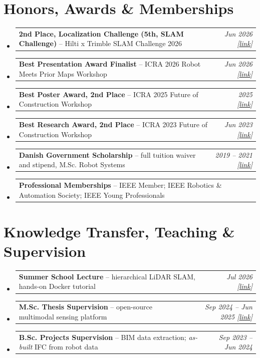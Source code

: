 \documentclass[a4paper,11pt]{article}
\makeatletter
\newcommand{\resumePOR}[3]{
\vspace{0.5mm}\item
    \begin{tabular*}{0.97\textwidth}[t]{l@{\extracolsep{\fill}}r}
        \textbf{#1}\hspace{0.3mm}#2 & \textit{\small{#3}}
    \end{tabular*}
    \vspace{-2mm}
}
\newcommand{\resumeSubHeadingListStart}{\begin{itemize}[leftmargin=*,labelsep=1mm]}
\newcommand{\resumeSubHeadingListEnd}{\end{itemize}\vspace{2mm}}
\makeatother
\begin{document}
\section{\textbf{Honors, Awards \& Memberships}}
\vspace{-0.4mm}
\resumeSubHeadingListStart
\resumePOR{2nd Place, Localization Challenge (5th, SLAM Challenge)}
    { -- Hilti x Trimble SLAM Challenge 2026}
    {Jun 2026 [\href{https://1drv.ms/b/c/4db9ccab9d8d9130/IQAVaj7i87MISqTeKhItu4OcAVn_ldM8NaGeo2eHFK6QC8Q?e=fDm2Pt}{link}]}
\resumePOR{Best Presentation Award Finalist}
    { -- ICRA 2026 Robot Meets Prior Maps Workshop}
    {Jun 2026 [\href{https://1drv.ms/i/c/4db9ccab9d8d9130/IQB3rUq4c1sJTb4PupPbnu5DAYNO4_C31DYuqXdi1GAZZKc?e=5cLZrE}{link}]}
\resumePOR{Best Poster Award, 2nd Place}
    { -- ICRA 2025 Future of Construction Workshop}
    {2025 [\href{https://construction-robots.github.io/index2025.html}{link}]}
\resumePOR{Best Research Award, 2nd Place}
    { -- ICRA 2023 Future of Construction Workshop}
    {Jun 2023 [\href{https://construction-robots.github.io/index2023.html}{link}]}
\resumePOR{Danish Government Scholarship}
    { -- full tuition waiver and stipend, M.Sc. Robot Systems}
    {2019 -- 2021 [\href{https://1drv.ms/b/c/4db9ccab9d8d9130/ETCRjZ2rzLkggE2rAAAAAAABBNsNs5ey6KEt632-vZz3jw?e=88YskF}{link}]}
\resumePOR{Professional Memberships}{ -- IEEE Member; IEEE Robotics \& Automation Society; IEEE Young Professionals}{}
\resumeSubHeadingListEnd
\vspace{-4mm}

\section{\textbf{Knowledge Transfer, Teaching \& Supervision}}
\vspace{-0.4mm}
\resumeSubHeadingListStart
\resumePOR{Summer School Lecture}{ -- hierarchical LiDAR SLAM, hands-on Docker tutorial}{Jul 2026 [\href{https://1drv.ms/b/c/4db9ccab9d8d9130/IQBY7fpZ9b9VQ7ZUtCZ3sQIXAe86RLZ_U_7Ici1Zl6MGrRI?e=UOcUQ3}{link}]}
\resumePOR{M.Sc. Thesis Supervision}{ -- open-source multimodal sensing platform}{Sep 2024 -- Jun 2025 [\href{https://1drv.ms/i/c/4db9ccab9d8d9130/ETsNxw8pvjdFtTJgmw_oU4gBiKo2bBd7cUP9dOsaJytEFg?e=aSnSOA}{link}]}
\resumePOR{B.Sc. Projects Supervision}{ -- BIM data extraction; \textit{as-built} IFC from robot data}{Sep 2023 -- Jun 2024}
\resumeSubHeadingListEnd
\vspace{-4mm}
\end{document}

